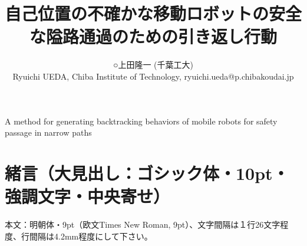 \documentclass{jarticle}
\begin{document}
\makeatletter

\title{自己位置の不確かな移動ロボットの安全な隘路通過のための引き返し行動}
{}
{A method for generating backtracking behaviors of mobile robots for safety passage in narrow paths}
{}

\author{
\begin{tabular}{c}
 ○\hspace{1zw}上田隆一 (千葉工大)\\
 {\small Ryuichi UEDA, Chiba Institute of Technology, ryuichi.ueda@p.chibakoudai.jp}
\end{tabular}
}

\makeatother


\date{} %

\maketitle
\thispagestyle{empty}
\pagestyle{empty}

\small
\section{緒言（大見出し：ゴシック体・10pt・\protect\\ 強調文字・中央寄せ）}%
本文：明朝体・9pt（欧文Times New Roman, 9pt）、文字間隔は１行26文字程度、行間隔は4.2mm程度にして下さい。
\end{document}
